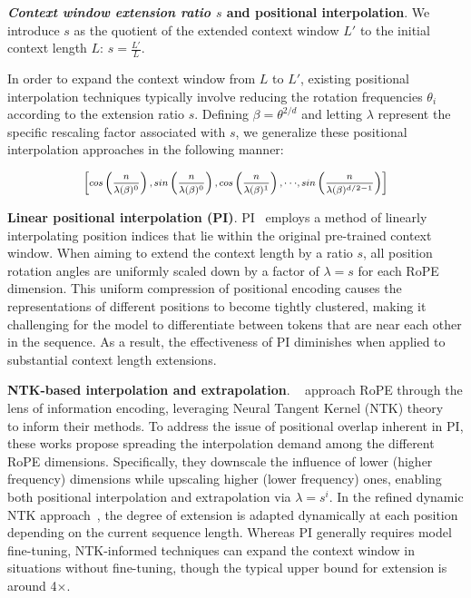 \textbf{\emph{Context window extension ratio $s$} and positional interpolation}. We introduce $s$ as the quotient of the extended context window $L'$ to the initial context length $L$: $s=\frac{L'}{L}$.

In order to expand the context window from $L$ to $L'$, existing positional interpolation techniques typically involve reducing the rotation frequencies $\theta_i$ according to the extension ratio $s$. Defining $\beta=\theta^{2/d}$ and letting $\lambda$ represent the specific rescaling factor associated with $s$, we generalize these positional interpolation approaches in the following manner:

\begin{equation}	
	\fontsize{7.5}{7.5} \selectfont
	\label{eq:unified_rope}
	\begin{aligned}
		\left[cos\left(\frac{n}{\lambda(\beta)^0}\right), sin \left(\frac{n}{\lambda(\beta)^0}\right), cos\left(\frac{n}{\lambda(\beta)^1}\right), \cdot\cdot\cdot,  sin \left(\frac{n}{\lambda(\beta)^{d/2-1}}\right) \right]   
	\end{aligned}
\end{equation}

\textbf{Linear positional interpolation (PI)}. PI~\cite{pi} employs a method of linearly interpolating position indices that lie within the original pre-trained context window. When aiming to extend the context length by a ratio $s$, all position rotation angles are uniformly scaled down by a factor of $\lambda=s$ for each RoPE dimension. This uniform compression of positional encoding causes the representations of different positions to become tightly clustered, making it challenging for the model to differentiate between tokens that are near each other in the sequence. As a result, the effectiveness of PI diminishes when applied to substantial context length extensions.

\textbf{NTK-based interpolation and extrapolation}. ~\cite{ntk,dynamicntk} approach RoPE through the lens of information encoding, leveraging Neural Tangent Kernel (NTK) theory~\cite{jacot2018neural,tancik2020fourier} to inform their methods. To address the issue of positional overlap inherent in PI, these works propose spreading the interpolation demand among the different RoPE dimensions. Specifically, they downscale the influence of lower (higher frequency) dimensions while upscaling higher (lower frequency) ones, enabling both positional interpolation and extrapolation via $\lambda=s^{i}$. In the refined dynamic NTK approach~\cite{dynamicntk}, the degree of extension is adapted dynamically at each position depending on the current sequence length. Whereas PI generally requires model fine-tuning, NTK-informed techniques can expand the context window in situations without fine-tuning, though the typical upper bound for extension is around 4$\times$.

